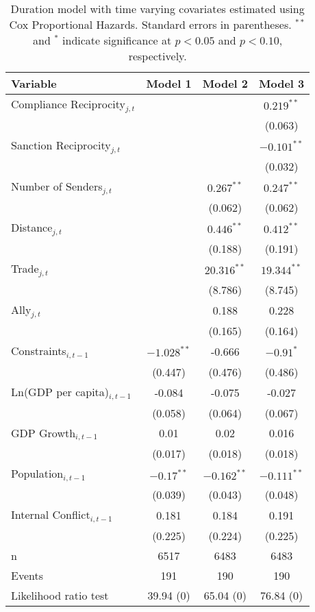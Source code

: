 \begin{table}[ht]
\centering
{\normalsize
\begin{tabular}{lccc}
 Variable & Model 1 & Model 2 & Model 3 \\ 
  \hline
\hline
Compliance Reciprocity$_{j,t}$ &  &  & $0.219^{\ast\ast}$ \\ 
   &  &  & (0.063) \\ 
  Sanction Reciprocity$_{j,t}$ &  &  & $-0.101^{\ast\ast}$ \\ 
   &  &  & (0.032) \\ 
   \hline
Number of Senders$_{j,t}$ &  & $0.267^{\ast\ast}$ & $0.247^{\ast\ast}$ \\ 
   &  & (0.062) & (0.062) \\ 
  Distance$_{j,t}$ &  & $0.446^{\ast\ast}$ & $0.412^{\ast\ast}$ \\ 
   &  & (0.188) & (0.191) \\ 
  Trade$_{j,t}$ &  & $20.316^{\ast\ast}$ & $19.344^{\ast\ast}$ \\ 
   &  & (8.786) & (8.745) \\ 
  Ally$_{j,t}$ &  & 0.188 & 0.228 \\ 
   &  & (0.165) & (0.164) \\ 
   \hline
Constraints$_{i,t-1}$ & $-1.028^{\ast\ast}$ & -0.666 & $-0.91^{\ast}$ \\ 
   & (0.447) & (0.476) & (0.486) \\ 
  Ln(GDP per capita)$_{i,t-1}$ & -0.084 & -0.075 & -0.027 \\ 
   & (0.058) & (0.064) & (0.067) \\ 
  GDP Growth$_{i,t-1}$ & 0.01 & 0.02 & 0.016 \\ 
   & (0.017) & (0.018) & (0.018) \\ 
  Population$_{i,t-1}$ & $-0.17^{\ast\ast}$ & $-0.162^{\ast\ast}$ & $-0.111^{\ast\ast}$ \\ 
   & (0.039) & (0.043) & (0.048) \\ 
  Internal Conflict$_{i,t-1}$ & 0.181 & 0.184 & 0.191 \\ 
   & (0.225) & (0.224) & (0.225) \\ 
   \hline
n & 6517 & 6483 & 6483 \\ 
  Events & 191 & 190 & 190 \\ 
  Likelihood ratio test & 39.94 (0) & 65.04 (0) & 76.84 (0) \\ 
   \hline
\hline
\end{tabular}
}
\caption{Duration model with time varying covariates estimated using Cox Proportional Hazards. Standard errors in parentheses. $^{**}$ and $^{*}$ indicate significance at $p< 0.05 $ and $p< 0.10 $, respectively.} 
\label{tab:regResults}
\end{table}

